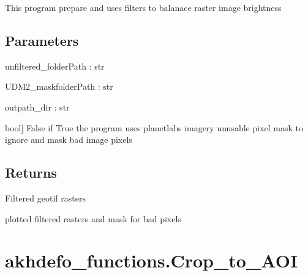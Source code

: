 \documentclass[letterpaper,10pt]{sphinxmanual}
\begin{document}
\begin{fulllineitems}
\label{\detokenize{generated/akhdefo_functions.Filter_PreProcess:akhdefo_functions.Filter_PreProcess}}
\pysigstartsignatures
{}
\pysigstopsignatures
\sphinxAtStartPar
This program prepare and uses filters to balanace raster image brightness


\section{Parameters}
\label{\detokenize{generated/akhdefo_functions.Filter_PreProcess:parameters}}
\sphinxAtStartPar
unfiltered\_folderPath : str

\sphinxAtStartPar
UDM2\_maskfolderPath : str

\sphinxAtStartPar
outpath\_dir : str
\begin{description}
\sphinxlineitem{Udm\_Mask\_Option}{[}bool{]}
\sphinxAtStartPar
False if True the program uses planetlabs imagery unusable pixel mask to ignore and mask bad image pixels

\end{description}


\section{Returns}
\label{\detokenize{generated/akhdefo_functions.Filter_PreProcess:returns}}\begin{description}
\sphinxAtStartPar
Filtered geotif rasters

\sphinxAtStartPar
plotted filtered rasters and mask for bad pixels

\end{description}

\end{fulllineitems}


\sphinxstepscope


\chapter{akhdefo\_functions.Crop\_to\_AOI}
\label{\detokenize{generated/akhdefo_functions.Crop_to_AOI:akhdefo-functions-crop-to-aoi}}\label{\detokenize{generated/akhdefo_functions.Crop_to_AOI::doc}}
\end{document}
